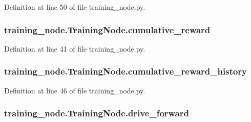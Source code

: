 Definition at line 50 of file training\+\_\+node.\+py.

\subsubsection[{\texorpdfstring{cumulative\+\_\+reward}{cumulative_reward}}]{\setlength{\rightskip}{0pt plus 5cm}training\+\_\+node.\+Training\+Node.\+cumulative\+\_\+reward}\hypertarget{classtraining__node_1_1_training_node_a1c132944727873d2f9449228f3845889}{}\label{classtraining__node_1_1_training_node_a1c132944727873d2f9449228f3845889}


Definition at line 41 of file training\+\_\+node.\+py.

\subsubsection[{\texorpdfstring{cumulative\+\_\+reward\+\_\+history}{cumulative_reward_history}}]{\setlength{\rightskip}{0pt plus 5cm}training\+\_\+node.\+Training\+Node.\+cumulative\+\_\+reward\+\_\+history}\hypertarget{classtraining__node_1_1_training_node_a458671c2da220b55b62284b0bb0a2916}{}\label{classtraining__node_1_1_training_node_a458671c2da220b55b62284b0bb0a2916}


Definition at line 46 of file training\+\_\+node.\+py.

\subsubsection[{\texorpdfstring{drive\+\_\+forward}{drive_forward}}]{\setlength{\rightskip}{0pt plus 5cm}training\+\_\+node.\+Training\+Node.\+drive\+\_\+forward}\hypertarget{classtraining__node_1_1_training_node_af53c5a749db204b5101fc583ef09c85e}{}\label{classtraining__node_1_1_training_node_af53c5a749db204b5101fc583ef09c85e}


